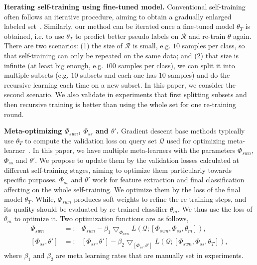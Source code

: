 \documentclass{article}
\newcommand{\myparagraph}[1]{\vspace{0.1em}\noindent\textbf{#1}}
\begin{document}
\myparagraph{Iterating self-training using fine-tuned model.}
Conventional self-training often follows an iterative procedure, aiming to obtain a gradually enlarged labeled set~\cite{Yarowsky95self_training, TrigueroGH15self_labeled}.
Similarly, our method can be iterated once a fine-tuned model $\theta_T$ is obtained, i.e. to use $\theta_T$ to predict better pseudo labels on $\mathcal{R}$ and re-train $\theta$ again. 
There are two scenarios: (1) the size of $\mathcal{R}$ is small, e.g. $10$ samples per class, so that self-training can only be repeated on the same data; and (2) that size is infinite (at least big enough, e.g. $100$ samples per class), we can split it into multiple subsets (e.g. $10$ subsets and each one has $10$ samples) and do the recursive learning each time on a new subset. In this paper, we consider the second scenario. We also validate in experiments that first splitting subsets and then recursive training is better than using the whole set for one re-training round.


\myparagraph{Meta-optimizing $\Phi_{swn}$, $\Phi_{ss}$ and $\theta'$.}
Gradient descent base methods typically use $\theta_T$ to compute the validation loss on query set $\mathcal{Q}$ used for optimizing meta-learner~\cite{SunCVPR2019, FinnAL17}.
In this paper, we have multiple meta-learners with the parameters $\Phi_{swn}$, $\Phi_{ss}$ and $\theta'$.
We propose to update them by the validation losses calculated at different self-training stages, aiming to optimize them particularly towards specific purposes. 
$\Phi_{ss}$ and $\theta'$ work for feature extraction and final classification affecting on the whole self-training. We optimize them by the loss of the final model $\theta_T$.
While, $\Phi_{swn}$ produces soft weights to refine the re-training steps, and its quality should be evaluated by re-trained classifier $\theta_m$.
We thus use the loss of $\theta_{m}$ to optimize it.
Two optimization functions are as follows, 
\begin{eqnarray} 
\label{meta_update_1}
\Phi_{swn} &=:& \Phi_{swn}-\beta_{1}\bigtriangledown_{\Phi_{swn}}L(\mathcal{Q}; [\Phi_{swn}, \Phi_{ss}, \theta_{m}]),\\
\label{meta_update_2}
[\Phi_{ss},\theta'] &=:& [\Phi_{ss},\theta']-\beta_{2}\bigtriangledown_{[\Phi_{ss}, \theta']}L(\mathcal{Q}; [\Phi_{swn}, \Phi_{ss}, \theta_{T}]),
\end{eqnarray}
where $\beta_{1}$ and $\beta_{2}$ are meta learning rates that are manually set in experiments.
 
\label{expriments}
\end{document}
